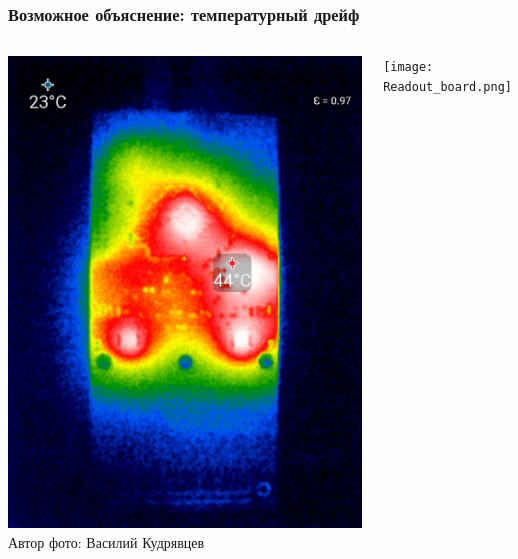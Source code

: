 \documentclass[14pt]{beamer}
\begin{document}
\begin{frame}[c]
\frametitle{Возможное объяснение: температурный дрейф}
\vspace{10pt}
\begin{columns}
	\begin{minipage}[t][1\textheight]{\linewidth}
		\centering\includegraphics[width=0.8\linewidth]{Thermal_image.jpg}
		\newline \tiny{Автор фото: Василий Кудрявцев}
	\end{minipage}%
	\begin{minipage}[t][1\textheight]{\linewidth}
		\centering \texttt{[image: Readout\_board.png]}
	\end{minipage}
\end{columns}
\end{frame}
\end{document}
